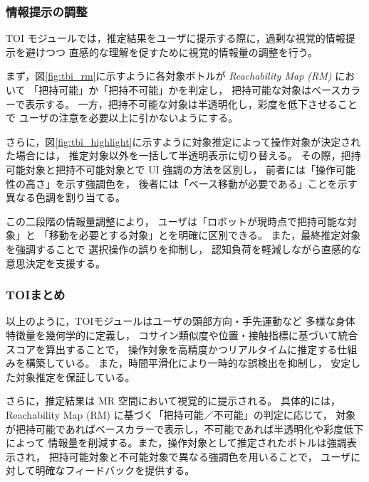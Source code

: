\documentclass[../../main.tex]{subfiles} %
\begin{document}
\subsubsection{情報提示の調整}
TOI モジュールでは，推定結果をユーザに提示する際に，過剰な視覚的情報提示を避けつつ
直感的な理解を促すために視覚的情報量の調整を行う。

まず，図\ref{fig:tbi_rm}に示すように各対象ボトルが \textit{Reachability Map (RM)} \cite{RM}において
「把持可能」か「把持不可能」かを判定し，
把持可能な対象はベースカラーで表示する。
一方，把持不可能な対象は半透明化し，彩度を低下させることで
ユーザの注意を必要以上に引かないようにする。


さらに，図\ref{fig:tbi_highlight}に示すように対象推定によって操作対象が決定された場合には，
推定対象以外を一括して半透明表示に切り替える。
その際，把持可能対象と把持不可能対象とで
UI 強調の方法を区別し，
前者には「操作可能性の高さ」を示す強調色を，
後者には「ベース移動が必要である」ことを示す異なる色調を割り当てる。


この二段階の情報量調整により，
ユーザは「ロボットが現時点で把持可能な対象」と
「移動を必要とする対象」とを明確に区別できる。
また，最終推定対象を強調することで
選択操作の誤りを抑制し，
認知負荷を軽減しながら直感的な意思決定を支援する。

\subsubsection{TOIまとめ} 
以上のように，TOIモジュールはユーザの頭部方向・手先運動など
多様な身体特徴量を幾何学的に定義し，
コサイン類似度や位置・接触指標に基づいて統合スコアを算出することで，
操作対象を高精度かつリアルタイムに推定する仕組みを構築している。
また，時間平滑化により一時的な誤検出を抑制し，
安定した対象推定を保証している。

さらに，推定結果は MR 空間において視覚的に提示される。
具体的には，Reachability Map (RM) に基づく「把持可能／不可能」の判定に応じて，
対象が把持可能であればベースカラーで表示し，不可能であれば半透明化や彩度低下によって
情報量を削減する。また，操作対象として推定されたボトルは強調表示され，
把持可能対象と不可能対象で異なる強調色を用いることで，
ユーザに対して明確なフィードバックを提供する。
\end{document}
